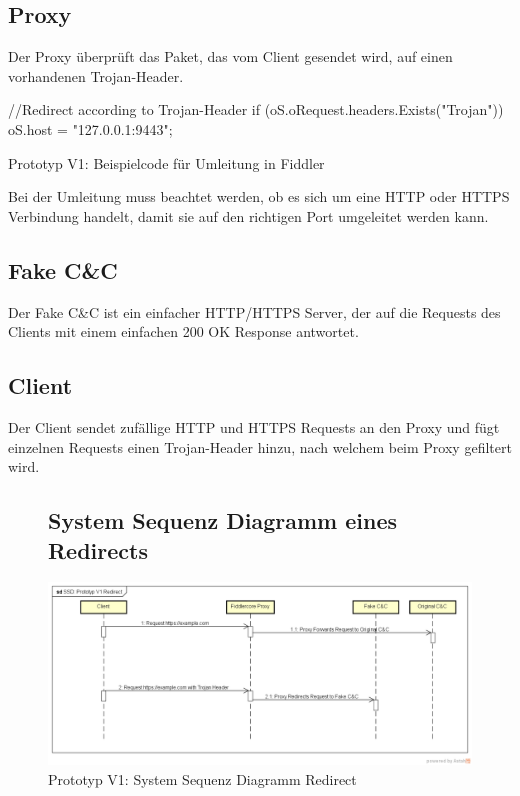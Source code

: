 \subsection{Proxy}
Der Proxy überprüft das Paket, das vom Client gesendet wird, auf einen vorhandenen Trojan-Header.

\begin{listing}[H]
\begin{csharpcode}
//Redirect according to Trojan-Header
if (oS.oRequest.headers.Exists("Trojan")) oS.host = "127.0.0.1:9443";
\end{csharpcode}
\caption{Prototyp V1: Beispielcode für Umleitung in Fiddler}
\label{lst:fiddler-core}
\end{listing}

Bei der Umleitung muss beachtet werden, ob es sich um eine HTTP oder HTTPS Verbindung handelt, damit sie auf den richtigen Port umgeleitet werden kann.

\subsection{Fake C\&C}
\label{protv1:fakecc}
Der Fake C\&C ist ein einfacher HTTP/HTTPS Server, der auf die Requests des Clients mit einem einfachen 200 OK Response antwortet.

\subsection{Client}
\label{protv1:client}
Der Client sendet zufällige HTTP und HTTPS Requests an den Proxy und fügt einzelnen Requests einen Trojan-Header hinzu, nach welchem beim Proxy gefiltert wird.

\begin{figure}[htbp!]
	\subsection{System Sequenz Diagramm eines Redirects}
	\centering
	\includegraphics[width=\textwidth]{img/ssd.png}
	\caption{Prototyp V1: System Sequenz Diagramm Redirect}
	\label{fig:SSD: Prototyp V1 Redirect}
\end{figure}


